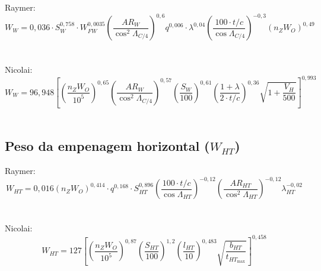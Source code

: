     Raymer:
    \begin{equation*}
      W_W =
        0,036 \cdot
        S_W^{0,758} \cdot
        W_{FW}^{0,0035}
        \left(
          \frac
          {{AR}_W}
          {\cos^2\Lambda_{C/4}}
        \right)^{0,6}
        q^{0,006} \cdot
        \lambda^{0,04}
        \left(
          \frac
          {100 \cdot t/c}
          {\cos \Lambda_{C/4}}
        \right)^{-0,3}
        \left(
          n_Z W_O
        \right)^{0,49}
    \end{equation*}
		\\~\\
    Nicolai:
    \begin{equation*}
      W_W =
        96,948
        \left[
          \left( \frac
            {n_Z W_O}
            {10^5}
          \right) ^ {0,65}
          \left( \frac
            {{AR}_W}
            {\cos^2\Lambda_{C/4}}
          \right) ^ {0,57}
          \left( \frac
            {S_W}
            {100}
          \right) ^ {0,61}
          \left( \frac
            {1 + \lambda}
            {2 \cdot t/c}
          \right) ^ {0,36}
          \sqrt{1 + \frac{V_H}{500}}
        \right] ^ {0,993}
    \end{equation*}
		\\

  \subsection{Peso da empenagem horizontal ($W_{HT}$)}

    Raymer:
    \begin{equation*}
      W_{HT} = 0,016
        \left(
          n_Z W_O
        \right) ^ {0,414} \cdot
        q^{0,168} \cdot
        S_{HT}^{0,896}
        \left( \frac
          {100 \cdot t/c}
          {\cos \Lambda_{HT}}
        \right) ^ {-0,12}
        \left( \frac
          {{AR}_{HT}}
          {\cos^2 \Lambda_{HT}}
        \right) ^ {-0,12}
        \lambda_{HT}^{-0,02}
    \end{equation*}
		\\~\\
    Nicolai:
    \begin{equation*}
      W_{HT} = 127 \left[
          \left( \frac
            {n_Z W_O}
            {10^5}
          \right) ^ {0,87}
          \left( \frac
            {S_{HT}}
            {100}
          \right) ^ {1,2}
          \left( \frac
            {l_{HT}}
            {10}
          \right) ^ {0,483}
          \sqrt{ \frac
            {b_{HT}}
            {t_{HT_{\max}}}
          }
        \right] ^ {0,458}
    \end{equation*}
		\\

